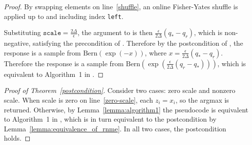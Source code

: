 \documentclass{article}
\begin{document}
\begin{proof}
    By swapping elements on line~\ref{shuffle},
    an online Fisher-Yates shuffle is applied up to and including index \texttt{left}.

    Substituting $\texttt{scale} = \frac{2\Delta}{\epsilon}$,
    the argument to  is then $\frac{\epsilon}{2\Delta}(q_* - q_r)$,
    which is non-negative, satisfying the precondition of .
    Therefore by the postcondition of , 
    the response is a sample from $\mathrm{Bern}(\exp(-x))$, where $x = \frac{\epsilon}{2\Delta}(q_* - q_r)$.
    Therefore the response is a sample from $\mathrm{Bern}(\exp(\frac{\epsilon}{2\Delta}(q_r - q_*)))$,
    which is equivalent to Algorithm~1 in \cite{mckenna2020permute}.
\end{proof}

\begin{proof}[Proof of Theorem~\ref{postcondition}]
    Consider two cases: zero scale and nonzero scale.
    When scale is zero on line~\ref{zero-scale},
    each $z_i = x_i$, so the argmax is returned.
    Otherwise, by Lemma~\ref{lemma:algorithm1} the pseudocode is equivalent to Algorithm~1 in \cite{mckenna2020permute}, 
    which is in turn equivalent to the postcondition by Lemma~\ref{lemma:equivalence_of_rnme}.
    In all two cases, the postcondition holds.
\end{proof}



\end{document}
